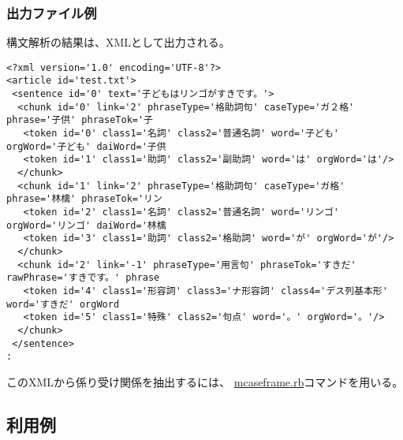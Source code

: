 \subsubsection*{出力ファイル例} 

構文解析の結果は、XMLとして出力される。

\begin{Verbatim}[baselinestretch=0.7,frame=single]
<?xml version='1.0' encoding='UTF-8'?>
<article id='test.txt'>
 <sentence id='0' text='子どもはリンゴがすきです。'>
  <chunk id='0' link='2' phraseType='格助詞句' caseType='ガ２格' phrase='子供' phraseTok='子
   <token id='0' class1='名詞' class2='普通名詞' word='子ども' orgWord='子ども' daiWord='子供
   <token id='1' class1='助詞' class2='副助詞' word='は' orgWord='は'/>
  </chunk>
  <chunk id='1' link='2' phraseType='格助詞句' caseType='ガ格' phrase='林檎' phraseTok='リン
   <token id='2' class1='名詞' class2='普通名詞' word='リンゴ' orgWord='リンゴ' daiWord='林檎
   <token id='3' class1='助詞' class2='格助詞' word='が' orgWord='が'/>
  </chunk>
  <chunk id='2' link='-1' phraseType='用言句' phraseTok='すきだ' rawPhrase='すきです。' phrase
   <token id='4' class1='形容詞' class3='ナ形容詞' class4='デス列基本形' word='すきだ' orgWord
   <token id='5' class1='特殊' class2='句点' word='。' orgWord='。'/>
  </chunk>
 </sentence>
:
\end{Verbatim}

このXMLから係り受け関係を抽出するには、
\hyperref[sect:mcaseframe]{mcaseframe.rb}コマンドを用いる。


\subsection{利用例}


%

